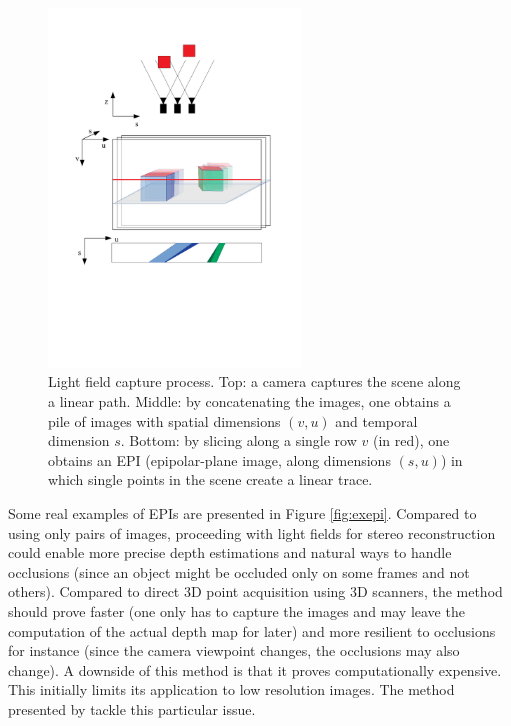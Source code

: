 \documentclass{article}
\theoremstyle{definition}
\begin{document}
\begin{figure}[ht]
\centering
 \includegraphics[width=0.6\textwidth, trim=2cm 8cm 2cm 3cm, clip]{drawings/light_fields.eps}
 \caption{Light field capture process. Top: a camera captures the scene along a linear path. Middle: by concatenating the images, one obtains a pile of images with spatial dimensions $(v, u)$ and temporal dimension $s$. Bottom: by slicing along a single row $v$ (in red), one obtains an EPI (epipolar-plane image, along dimensions $(s, u)$) in which single points in the scene create a linear trace.}
 \label{drawing:light_fields}
\end{figure}


Some real examples of EPIs are presented in Figure \ref{fig:exepi}. Compared to using only pairs of images, proceeding with light fields for stereo reconstruction could enable more precise depth estimations and natural ways to handle occlusions (since an object might be occluded only on some frames and not others). Compared to direct 3D point acquisition using 3D scanners, the method should prove faster (one only has to capture the images and may leave the computation of the actual depth map for later) and more resilient to occlusions for instance (since the camera viewpoint changes, the occlusions may also change). A downside of this method is that it proves computationally expensive. This initially limits its application to low resolution images. The method presented by \cite{art:kim13:lfields} tackle this particular issue.
\end{document}
